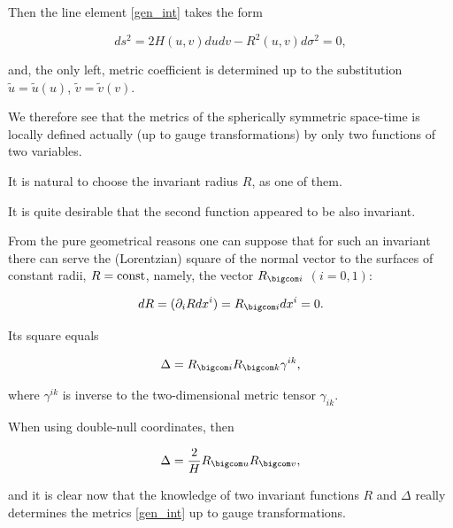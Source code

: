 Then the line element \eqref{gen_int} takes the form

\begin{equation}

\label{isot_int}

ds^2=2H(u,v)dudv-R^2(u,v)d\sigma ^2=0,

\end{equation}

and, the only left, metric coefficient is determined up to the substitution ${\tilde u=\tilde u(u)}$, $\tilde v = \tilde v(v)$. 

We therefore see that the metrics of the spherically symmetric space-time is locally defined actually (up to gauge transformations) by only two functions of two variables. 

It is natural to choose the invariant radius $R$, as one of them. 

It is quite desirable that the second function appeared to be also invariant. 

From the pure geometrical reasons one can suppose that for such an invariant there can serve the (Lorentzian) square of the normal vector to the surfaces of constant radii, $R=\rm  const$, namely, the vector $R_{\bigcom i}$ $(i=0, 1)$:

\begin{equation}

dR=(\partial_i Rdx^i) = R_{\bigcom i}dx^i = 0.

\end{equation}

Its square equals

\begin{equation}

\label{delta} \Delta=R_{\bigcom i} R_{\bigcom k} \gamma^{ik},

\end{equation}

where $\gamma^{ik}$ is inverse to the two-dimensional metric tensor $\gamma_{ik}$. 

When using double-null coordinates, then

\begin{equation}

\Delta=\frac{2}{H}R_{\bigcom u} R_{\bigcom v},

\end{equation}

and it is clear now that the knowledge of two invariant functions $R$ and $\Delta$ really determines the metrics \eqref{gen_int} up to gauge transformations.



